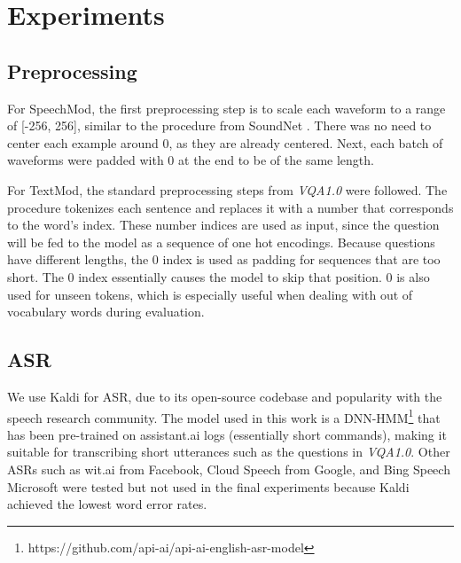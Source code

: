\documentclass[letterpaper]{article} %
\begin{document}
\section{Experiments}
\subsection{Preprocessing}
For SpeechMod, the first preprocessing step is to scale each waveform to a range of [-256, 256], similar to the procedure from SoundNet \cite{soundnet}. There was no need to center each example around 0, as they are already centered. Next, each batch of waveforms were padded with 0 at the end to be of the same length.

For TextMod, the standard preprocessing steps from \textit{VQA1.0} were followed. The procedure tokenizes each sentence and replaces it with a number that corresponds to the word's index. These number indices are used as input, since the question will be fed to the model as a sequence of one hot encodings. Because questions have different lengths, the 0 index is used as padding for sequences that are too short. The 0 index essentially causes the model to skip that position. 0 is also used for unseen tokens, which is especially useful when dealing with out of vocabulary words during evaluation.

\subsection{ASR}
We use Kaldi \cite{kaldi} for ASR, due to its open-source codebase and popularity with the speech research community. The model used in this work is a DNN-HMM\footnote{https://github.com/api-ai/api-ai-english-asr-model} that has been pre-trained on assistant.ai logs (essentially short commands), making it suitable for transcribing short utterances such as the questions in \textit{VQA1.0}. Other ASRs such as wit.ai from Facebook, Cloud Speech from Google, and Bing Speech Microsoft were tested but not used in the final experiments because Kaldi achieved the lowest word error rates.
\end{document}
